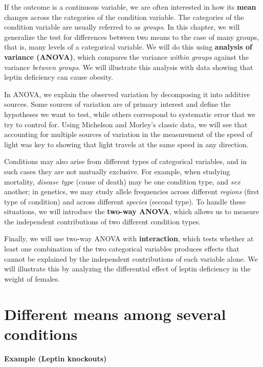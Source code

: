 \documentclass[
]{book}
\begin{document}
If the outcome is a continuous variable, we are often interested in how its \textbf{mean} changes across the categories of the condition variable. The categories of the condition variable are usually referred to as \emph{groups}. In this chapter, we will generalize the test for differences between two means to the case of many groups, that is, many levels of a categorical variable. We will do this using \textbf{analysis of variance (ANOVA)}, which compares the variance \emph{within groups} against the variance \emph{between groups}. We will illustrate this analysis with data showing that leptin deficiency can cause obesity.

In ANOVA, we explain the observed variation by decomposing it into additive sources. Some sources of variation are of primary interest and define the hypotheses we want to test, while others correspond to systematic error that we try to control for. Using Michelson and Morley's classic data, we will see that accounting for multiple sources of variation in the measurement of the speed of light was key to showing that light travels at the same speed in any direction.

Conditions may also arise from different types of categorical variables, and in such cases they are not mutually exclusive. For example, when studying mortality, \emph{disease type} (cause of death) may be one condition type, and \emph{sex} another; in genetics, we may study allele frequencies across different \emph{regions} (first type of condition) and across different \emph{species} (second type). To handle these situations, we will introduce the \textbf{two-way ANOVA}, which allows us to measure the independent contributions of two different condition types.

Finally, we will use two-way ANOVA with \textbf{interaction}, which tests whether at least one combination of the two categorical variables produces effects that cannot be explained by the independent contributions of each variable alone. We will illustrate this by analyzing the differential effect of leptin deficiency in the weight of females.

\hypertarget{different-means-among-several-conditions}{%
\section{Different means among several conditions}\label{different-means-among-several-conditions}}

\textbf{Example (Leptin knockouts)}
\end{document}
